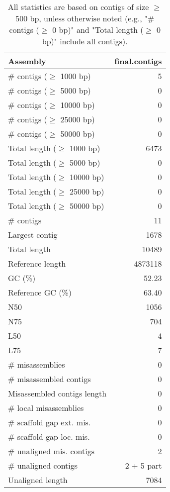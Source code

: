 \documentclass[12pt,a4paper]{article}
\begin{document}
\begin{table}[ht]
\begin{center}
\caption{All statistics are based on contigs of size $\geq$ 500 bp, unless otherwise noted (e.g., "\# contigs ($\geq$ 0 bp)" and "Total length ($\geq$ 0 bp)" include all contigs).}
\begin{tabular}{|l*{1}{|r}|}
\hline
Assembly & final.contigs \\ \hline
\# contigs ($\geq$ 1000 bp) & 5 \\ \hline
\# contigs ($\geq$ 5000 bp) & 0 \\ \hline
\# contigs ($\geq$ 10000 bp) & 0 \\ \hline
\# contigs ($\geq$ 25000 bp) & 0 \\ \hline
\# contigs ($\geq$ 50000 bp) & 0 \\ \hline
Total length ($\geq$ 1000 bp) & 6473 \\ \hline
Total length ($\geq$ 5000 bp) & 0 \\ \hline
Total length ($\geq$ 10000 bp) & 0 \\ \hline
Total length ($\geq$ 25000 bp) & 0 \\ \hline
Total length ($\geq$ 50000 bp) & 0 \\ \hline
\# contigs & 11 \\ \hline
Largest contig & 1678 \\ \hline
Total length & 10489 \\ \hline
Reference length & 4873118 \\ \hline
GC (\%) & 52.23 \\ \hline
Reference GC (\%) & 63.40 \\ \hline
N50 & 1056 \\ \hline
N75 & 704 \\ \hline
L50 & 4 \\ \hline
L75 & 7 \\ \hline
\# misassemblies & 0 \\ \hline
\# misassembled contigs & 0 \\ \hline
Misassembled contigs length & 0 \\ \hline
\# local misassemblies & 0 \\ \hline
\# scaffold gap ext. mis. & 0 \\ \hline
\# scaffold gap loc. mis. & 0 \\ \hline
\# unaligned mis. contigs & 2 \\ \hline
\# unaligned contigs & 2 + 5 part \\ \hline
Unaligned length & 7084 \\ \hline

\end{tabular}
\end{center}
\end{table}
\end{document}
